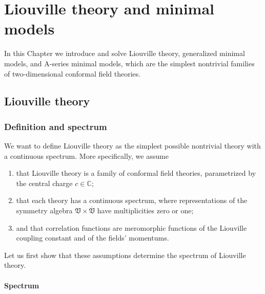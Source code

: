 \documentclass[12pt, a4paper, notitlepage, twoside]{report}
\numberwithin{equation}{section}
\theoremstyle{break}
\begin{document}

\cleardoublepage

\chapter{Liouville theory and minimal models \label{seccbm}}

In this Chapter we introduce and solve Liouville theory, generalized minimal models, and A-series minimal models, which are the simplest nontrivial families of two-dimensional conformal field theories. 

\section{Liouville theory \label{secliou}}

\subsection{Definition and spectrum \label{secspe}}

We want to define Liouville theory as the simplest possible nontrivial theory with a continuous spectrum. More specifically, we assume
\begin{enumerate}
 \item that Liouville theory is a family of conformal field theories, parametrized by the central charge $c\in\mathbb{C}$;
\item that each theory has a continuous spectrum, where representations of the symmetry algebra $\mathfrak{V}\times\overline{\mathfrak{V}}$ have multiplicities zero or one;
\item and that correlation functions are meromorphic functions of the Liouville coupling constant and of the fields' momentums.
\end{enumerate}
Let us first show that these assumptions determine the spectrum of Liouville theory.

\subsubsection{Spectrum}
\end{document}
